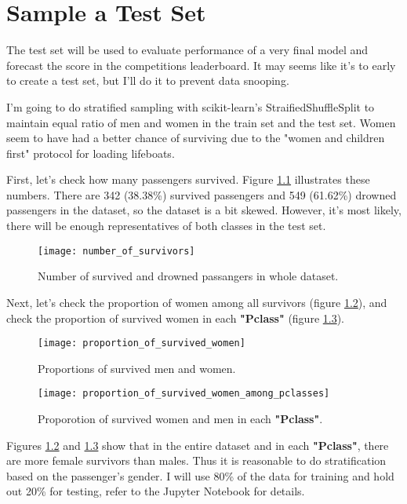 \chapter{Sample a Test Set}
The test set will be used to evaluate performance of a very final model
and forecast the score in the competitions leaderboard. It may seems like
it's to early to create a test set, but I'll do it to prevent data snooping.

I'm going to do stratified sampling with scikit-learn's StraifiedShuffleSplit
to maintain equal ratio of men and women in the train set and the test set.
Women seem to have had a better chance of surviving due to the "women and
children first" protocol for loading lifeboats.

First, let's check how many passengers survived. Figure 
\ref{number_of_survivors} illustrates these numbers. There are 342 (38.38\%)
survived passengers and 549 (61.62\%) drowned passengers in the dataset, 
so the dataset is a bit skewed. However, it's most likely, there will be 
enough representatives of both classes in the test set.

\begin{figure}[!ht]
	\centering
	\texttt{[image: number\_of\_survivors]}
	\caption{Number of survived and drowned passangers in whole dataset.}
	\label{number_of_survivors}
\end{figure}

Next, let's check the proportion of women among all survivors (figure
\ref{proportion_of_survived_women}), and check the proportion of survived
women in each \textbf{"Pclass"} (figure 
\ref{proportion_of_survived_women_among_pclasses}).

\begin{figure}[!ht]
	\centering
	\texttt{[image: proportion\_of\_survived\_women]}
	\caption{Proportions of survived men and women.}
	\label{proportion_of_survived_women}
\end{figure}

\begin{figure}[!ht]
	\centering
	\texttt{[image: proportion\_of\_survived\_women\_among\_pclasses]}
	\caption{Proporotion of survived women and men in each \textbf{"Pclass"}.}
	\label{proportion_of_survived_women_among_pclasses}
\end{figure}

Figures \ref{proportion_of_survived_women} and 
\ref{proportion_of_survived_women_among_pclasses} show that in the entire 
dataset and in each \textbf{"Pclass"}, there are more female survivors 
than males. Thus it is reasonable to do stratification based on the
passenger's gender. I will use 80\% of the data for training and hold 
out 20\% for testing, refer to the Jupyter Notebook for details.